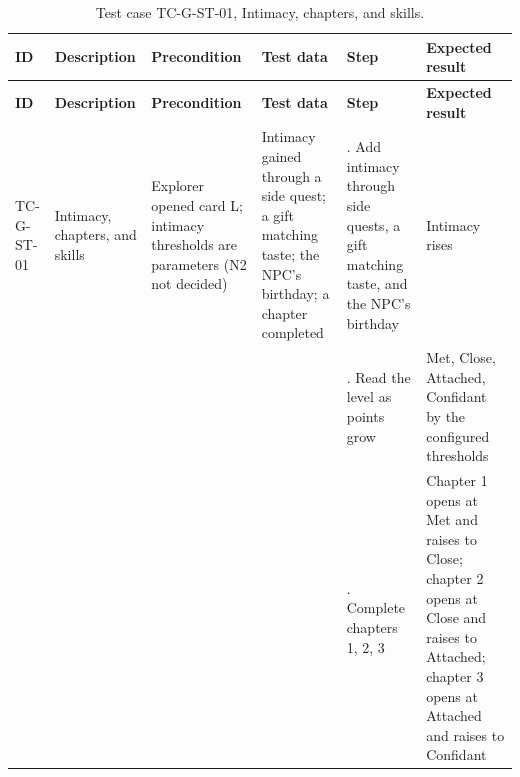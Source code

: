 {\footnotesize{}\renewcommand{\arraystretch}{1.1}
\begin{longtable}{|>{\raggedright\arraybackslash}p{}|>{\raggedright\arraybackslash}p{}|>{\raggedright\arraybackslash}p{}|>{\raggedright\arraybackslash}p{}|>{\raggedright\arraybackslash}p{}|>{\raggedright\arraybackslash}p{}|}
\caption{Test case TC-G-ST-01, Intimacy, chapters, and skills.} \\
\hline
\textbf{ID} & \textbf{Description} & \textbf{Precondition} & \textbf{Test data} & \textbf{Step} & \textbf{Expected result} \\ \hline
\endfirsthead
\hline
\textbf{ID} & \textbf{Description} & \textbf{Precondition} & \textbf{Test data} & \textbf{Step} & \textbf{Expected result} \\ \hline
\endhead
TC-G-ST-01 & Intimacy, chapters, and skills & Explorer opened card L; intimacy thresholds are parameters (N2 not decided) & Intimacy gained through a side quest; a gift matching taste; the NPC's birthday; a chapter completed & 1. Add intimacy through side quests, a gift matching taste, and the NPC's birthday & Intimacy rises \\ \cline{5-6}
 &  &  &  & 2. Read the level as points grow & Met, Close, Attached, Confidant by the configured thresholds \\ \cline{5-6}
 &  &  &  & 3. Complete chapters 1, 2, 3 & Chapter 1 opens at Met and raises to Close; chapter 2 opens at Close and raises to Attached; chapter 3 opens at Attached and raises to Confidant \\ \hline
\end{longtable}
}

